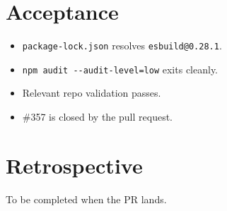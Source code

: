 \section{Acceptance}\label{record-215-acceptance}

\begin{itemize}
\tightlist
\item
  \texttt{p\allowbreak{}a\allowbreak{}c\allowbreak{}k\allowbreak{}a\allowbreak{}g\allowbreak{}e\allowbreak{}-\allowbreak{}l\allowbreak{}o\allowbreak{}c\allowbreak{}k\allowbreak{}.\allowbreak{}j\allowbreak{}s\allowbreak{}o\allowbreak{}n} resolves \texttt{e\allowbreak{}s\allowbreak{}b\allowbreak{}u\allowbreak{}i\allowbreak{}l\allowbreak{}d\allowbreak{}@\allowbreak{}0\allowbreak{}.\allowbreak{}2\allowbreak{}8\allowbreak{}.\allowbreak{}1}.
\item
  \texttt{n\allowbreak{}p\allowbreak{}m\allowbreak{} \allowbreak{}a\allowbreak{}u\allowbreak{}d\allowbreak{}i\allowbreak{}t\allowbreak{} \allowbreak{}-\allowbreak{}-\allowbreak{}a\allowbreak{}u\allowbreak{}d\allowbreak{}i\allowbreak{}t\allowbreak{}-\allowbreak{}l\allowbreak{}e\allowbreak{}v\allowbreak{}e\allowbreak{}l\allowbreak{}=\allowbreak{}l\allowbreak{}o\allowbreak{}w} exits cleanly.
\item
  Relevant repo validation passes.
\item
  \#357 is closed by the pull request.
\end{itemize}

\section{Retrospective}\label{record-215-retrospective}

To be completed when the PR lands.

